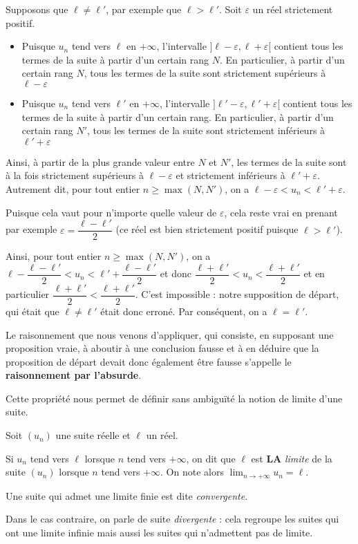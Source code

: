 \documentclass[11pt,fleqn]{book} %
\begin{document}
\begin{demonstration}Supposons que $\ell \neq \ell'$, par exemple que $\ell>\ell'$. Soit $\varepsilon$ un réel strictement positif.
\begin{itemize}
\item Puisque $u_n$ tend vers $\ell$ en $+\infty$, l'intervalle $] \ell- \varepsilon, \ell+\varepsilon [$ contient tous les termes de la suite à partir d'un certain rang $N$. En particulier, à partir d'un certain rang $N$, tous les termes de la suite sont strictement supérieurs à $\ell-\varepsilon $ \item Puisque $u_n$ tend vers $\ell'$ en $+\infty$, l'intervalle $] \ell'- \varepsilon, \ell'+\varepsilon [$ contient tous les termes de la suite à partir d'un certain rang. En particulier, à partir d'un certain rang $N'$, tous les termes de la suite sont strictement inférieurs à $\ell'+\varepsilon $
\end{itemize}
Ainsi, à partir de la plus grande valeur entre $N$ et $N'$, les termes de la suite sont à la fois strictement supérieurs à $\ell-\varepsilon$ et strictement inférieurs à $\ell'+\varepsilon$. Autrement dit, pour tout entier $n \geqslant \max(N,N')$, on a $ \ell-\varepsilon < u_n < \ell'+\varepsilon$.

 Puisque cela vaut pour n'importe quelle valeur de $\varepsilon$, cela reste vrai en prenant par exemple $\varepsilon = \dfrac{\ell-\ell'}{2}$ (ce réel est bien strictement positif puisque $\ell>\ell'$).

Ainsi, pour tout entier $n\geqslant \max(N,N')$, on a $\ell-\dfrac{\ell-\ell'}{2}< u_n < \ell'+\dfrac{\ell-\ell'}{2}$ et donc $\dfrac{\ell+\ell'}{2} < u_n < \dfrac{\ell+\ell'}{2}$ et en particulier $\dfrac{\ell+\ell'}{2} < \dfrac{\ell+\ell'}{2}$. C'est impossible : notre supposition de départ, qui était que $\ell \neq \ell'$ était donc erroné. Par conséquent, on a $\ell=\ell'$.

Le raisonnement que nous venons d'appliquer, qui consiste, en supposant une proposition vraie, à aboutir à une conclusion fausse et à en déduire que la proposition de départ devait donc également être fausse s'appelle le \textbf{raisonnement par l'absurde}.\end{demonstration}


Cette propriété nous permet de définir sans ambiguïté la notion de limite d'une suite.

\begin{definition} Soit $(u_n)$ une suite réelle et $\ell$ un réel. 

Si $u_n$ tend vers $\ell$ lorsque $n$ tend vers $+\infty$, on dit que $\ell$ est \textbf{LA} \textit{limite} de la suite $(u_n)$ lorsque $n$ tend vers $+\infty$. On note alors $\displaystyle \lim _{ n \to +\infty} u_n = \ell$.


Une suite qui admet une limite finie est dite \textit{convergente}. 

Dans le cas contraire, on parle de suite \textit{divergente} : cela regroupe les suites qui ont une limite infinie mais aussi les suites qui n'admettent pas de limite.\end{definition}
\end{document}
